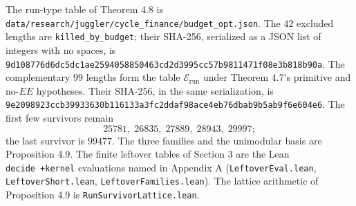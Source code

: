 \documentclass[12pt]{article}
\begin{document}
The run-type table of Theorem 4.8 is
\texttt{\nolinkurl{data/research/juggler/cycle_finance/budget_opt.json}}.
The \(42\) excluded lengths are \texttt{\nolinkurl{killed_by_budget}};
their SHA-256, serialized as a JSON list of integers with no spaces, is
\texttt{\nolinkurl{9d108776d6dc5dc1ae2594058850463cd2d3995cc57b9811471f08e3b818b90a}}.
The complementary \(99\) lengths form the table
\(\mathcal E_{\mathrm{run}}\) under Theorem 4.7's primitive and
no-\(EE\) hypotheses. Their SHA-256, in the same serialization, is
\texttt{\nolinkurl{9e2098923ccb39933630b116133a3fc2ddaf98ace4eb76dbab9b5ab9f6e604e6}}.
The first few survivors remain \[
25781,\;26835,\;27889,\;28943,\;29997;
\] the last survivor is \(99477\). The three families and the unimodular
basis are Proposition 4.9. The finite leftover tables of Section 3 are
the Lean \texttt{decide\ +kernel} evaluations named in Appendix A
(\texttt{\nolinkurl{LeftoverEval.lean}},
\texttt{\nolinkurl{LeftoverShort.lean}},
\texttt{\nolinkurl{LeftoverFamilies.lean}}). The lattice arithmetic of
Proposition 4.9 is \texttt{\nolinkurl{RunSurvivorLattice.lean}}.
\end{document}
